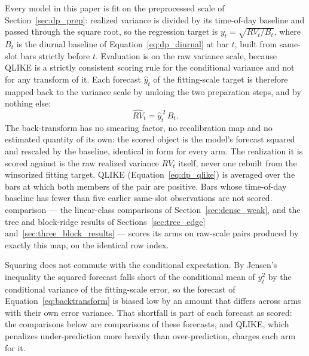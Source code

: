 Every model in this paper is fit on the preprocessed scale of
Section~\ref{sec:dp_prep}: realized variance is divided by its
time-of-day baseline and passed through the square root, so the
regression target is $y_t = \sqrt{RV_t / B_t}$, where $B_t$ is the
diurnal baseline of Equation~\eqref{eq:dp_diurnal} at bar $t$, built
from same-slot bars strictly before $t$. Evaluation is on the raw
variance scale, because QLIKE is a strictly consistent scoring rule for
the conditional variance and not for any transform of it. Each forecast
$\hat{y}_t$ of the fitting-scale target is therefore mapped back to the
variance scale by undoing the two preparation steps, and by nothing
else:
\begin{equation}
    \widehat{RV}_t = \hat{y}_t^{\,2}\, B_t .
    \label{eq:backtransform}
\end{equation}
The back-transform has no smearing factor, no recalibration map and no
estimated quantity of its own: the scored object is the model's
forecast squared and rescaled by the baseline, identical in form for
every arm. The realization it is scored against is the raw realized
variance $RV_t$ itself, never one rebuilt from the winsorized fitting
target. QLIKE (Equation~\eqref{eq:dp_qlike}) is averaged over the bars
at which both members of the pair are positive. Bars whose time-of-day
baseline has fewer than five earlier same-slot observations are not
scored.
comparison --- the linear-class comparisons of
Section~\ref{sec:dense_weak}, and the tree and block-ridge results of
Sections~\ref{sec:tree_edge} and~\ref{sec:three_block_results} --- scores
its arms on raw-scale pairs produced by exactly this map, on the
identical row index.

Squaring does not commute with the conditional expectation. By Jensen's
inequality the squared forecast falls short of the conditional mean of
$y_t^2$ by the conditional variance of the fitting-scale error, so the
forecast of Equation~\eqref{eq:backtransform} is biased low by an amount
that differs across arms with their own error variance. That shortfall is
part of each forecast as scored: the comparisons below are comparisons of
these forecasts, and QLIKE, which penalizes under-prediction more heavily
than over-prediction, charges each arm for it.

